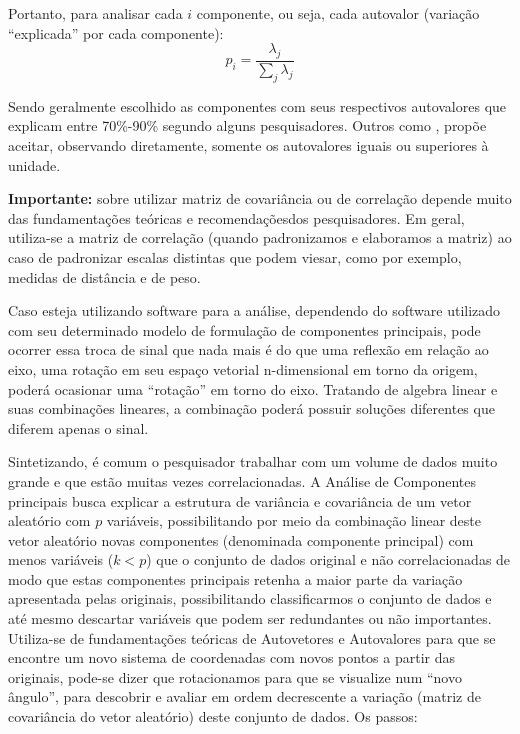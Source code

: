 \documentclass[
  openany]{book}
\begin{document}
Portanto, para analisar cada \(i\) componente, ou seja, cada autovalor (variação ``explicada'' por cada componente):
\begin{equation}
    p_i=\frac{\lambda_j}{\displaystyle \sum_j \lambda_j} 
    \label{eq:varind}
\end{equation}

Sendo geralmente escolhido as componentes com seus respectivos autovalores que explicam entre 70\%-90\% segundo alguns pesquisadores. Outros como \citet{kaiser1960application}, propõe aceitar, observando diretamente, somente os autovalores iguais ou superiores à unidade.

\textbf{Importante:} sobre utilizar matriz de covariância ou de correlação depende muito das fundamentações teóricas e recomendaçõesdos pesquisadores. Em geral, utiliza-se a matriz de correlação (quando padronizamos e elaboramos a matriz) ao caso de padronizar escalas distintas que podem viesar, como por exemplo, medidas de distância e de peso.

Caso esteja utilizando software para a análise, dependendo do software utilizado com seu determinado modelo de formulação de componentes principais, pode ocorrer essa troca de sinal que nada mais é do que uma reflexão em relação ao eixo, uma rotação em seu espaço vetorial n-dimensional em torno da origem, poderá ocasionar uma ``rotação'' em torno do eixo. Tratando de algebra linear e suas combinações lineares, a combinação poderá possuir soluções diferentes que diferem apenas o sinal.

Sintetizando, é comum o pesquisador trabalhar com um volume de dados muito grande e que estão muitas vezes correlacionadas. A Análise de Componentes principais busca explicar a estrutura de variância e covariância de um vetor aleatório com \(p\) variáveis, possibilitando por meio da combinação linear deste vetor aleatório novas componentes (denominada componente principal) com menos variáveis (\(k<p\)) que o conjunto de dados original e não correlacionadas de modo que estas componentes principais retenha a maior parte da variação apresentada pelas originais, possibilitando classificarmos o conjunto de dados e até mesmo descartar variáveis que podem ser redundantes ou não importantes. Utiliza-se de fundamentações teóricas de Autovetores e Autovalores para que se encontre um novo sistema de coordenadas com novos pontos a partir das originais, pode-se dizer que rotacionamos para que se visualize num ``novo ângulo'', para descobrir e avaliar em ordem decrescente a variação (matriz de covariância do vetor aleatório) deste conjunto de dados. Os passos:
\end{document}
